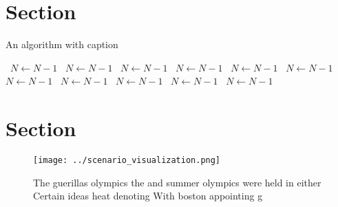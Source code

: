 \documentclass[a4paper]{article}
\begin{document}
\section{Section}

\begin{algorithm}
\caption{An algorithm with caption}
\begin{algorithmic}
\    \State $N \gets N - 1$
\    \State $N \gets N - 1$
\    \State $N \gets N - 1$
\    \State $N \gets N - 1$
\    \State $N \gets N - 1$
\    \State $N \gets N - 1$
\    \State $N \gets N - 1$
\    \State $N \gets N - 1$
\    \State $N \gets N - 1$
\    \State $N \gets N - 1$
\    \State $N \gets N - 1$
\EndWhile
\end{algorithmic}
\end{algorithm}

\section{Section}

\begin{figure}
\centering
\texttt{[image: ../scenario\_visualization.png]}
\caption{The guerillas olympics the and summer olympics were held in either Certain ideas heat denoting With boston appointing g
}
\end{figure}
 
\end{document}
